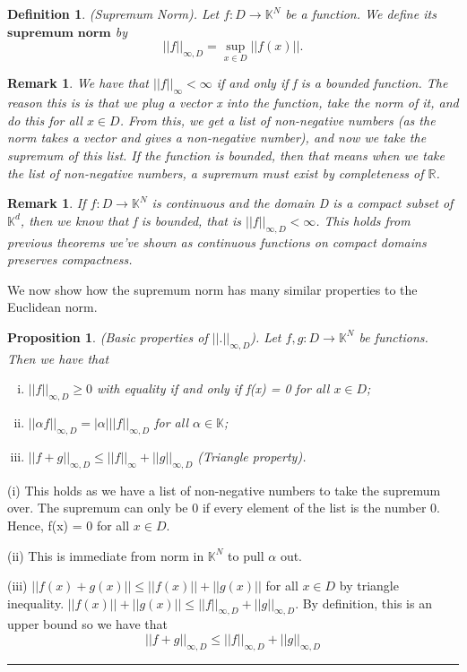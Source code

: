 \documentclass[twoside]{article}
\newtheorem{proposition}[theorem]{Proposition}
\newtheorem{remark}[theorem]{Remark}
\newtheorem{definition}[theorem]{Definition}
\newenvironment{proof}{{\bf Proof:}}{\hfill\rule{2mm}{2mm}}
\begin{document}
\begin{definition}(Supremum Norm). Let $f: D \rightarrow \mathbb{K}^N$ be a function. We define its $\textbf{supremum norm}$ by
$$
||f||_{\infty, D} = \sup_{x \in D}||f(x)||.
$$
\end{definition}

\begin{remark}We have that $||f||_{\infty} < \infty$ if and only if f is a bounded function. The reason this is is that we plug a vector x into the function, take the norm of it, and do this for all $x \in D$. From this, we get a list of non-negative numbers (as the norm takes a vector and gives a non-negative number), and now we take the supremum of this list. If the function is bounded, then that means when we take the list of non-negative numbers, a supremum must exist by completeness of $\mathbb{R}$. 
\end{remark}

\begin{remark}If $f: D \rightarrow \mathbb{K}^N$ is continuous and the domain D is a compact subset of $\mathbb{K}^d$, then we know that f is bounded, that is $||f||_{\infty,D} < \infty$. This holds from previous theorems we've shown as continuous functions on compact domains preserves compactness.
\end{remark}

We now show how the supremum norm has many similar properties to the Euclidean norm.

\begin{proposition}(Basic properties of $||.||_{\infty,D}$). Let $f,g: D \rightarrow \mathbb{K}^N$ be functions. Then we have that

\begin{enumerate}[(i)]
    \item $||f||_{\infty,D} \geq 0$ with equality if and only if f(x) = 0 for all $x \in D$;
    \item $||\alpha f||_{\infty,D} = |\alpha| ||f||_{\infty,D}$ for all $\alpha \in \mathbb{K}$;
    \item $||f+g||_{\infty,D} \leq ||f||_{\infty} + ||g||_{\infty,D}$ (Triangle property).
\end{enumerate}
\end{proposition}

\begin{proof}
(i) This holds as we have a list of non-negative numbers to take the supremum over. The supremum can only be 0 if every element of the list is the number 0. Hence, f(x) = 0 for all $x \in D$.

(ii) This is immediate from norm in $\mathbb{K}^N$ to pull $\alpha$ out.

(iii) $||f(x) + g(x)|| \leq ||f(x)|| + ||g(x)||$ for all $x \in D$ by triangle inequality. $||f(x)|| + ||g(x)|| \leq ||f||_{\infty,D} + ||g||_{\infty,D}$. By definition, this is an upper bound so we have that
$$
||f+g||_{\infty,D} \leq ||f||_{\infty,D} + ||g||_{\infty,D}
$$
\end{proof}
\end{document}
